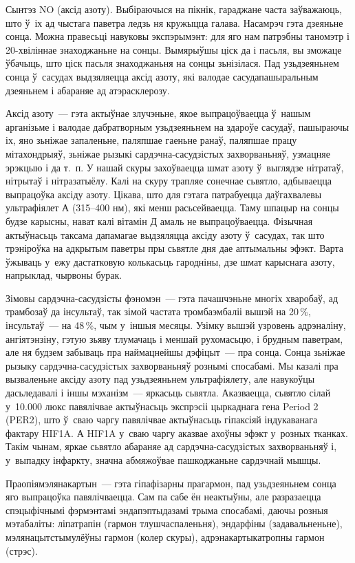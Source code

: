 Сынтэз NO (аксід азоту). Выбіраючыся на пікнік, гараджане часта заўважаюць, што ў~іх ад чыстага паветра ледзь ня кружыцца галава. Насамрэч гэта дзеяньне сонца. Можна правесьці навуковы экспэрымэнт: для яго нам патрэбны таномэтр і 20-хвіліннае знаходжаньне на сонцы. Вымярыўшы ціск да і пасьля, вы зможаце ўбачыць, што ціск пасьля знаходжаньня на сонцы зьнізілася. Пад узьдзеяньнем сонца ў~сасудах выдзяляецца аксід азоту, які валодае сасудапашыральным дзеяньнем і абараняе ад атэрасклерозу.

Аксід азоту~--- гэта актыўнае злучэньне, якое выпрацоўваецца ў~нашым арганізьме і валодае дабратворным узьдзеяньнем на здароўе сасудаў, пашыраючы іх, яно зьніжае запаленьне, паляпшае гаеньне ранаў, паляпшае працу мітахондрыяў, зьніжае рызыкі сардэчна-сасудзістых захворваньняў, узмацняе эрэкцыю і да т.~п. У нашай скуры захоўваецца шмат азоту ў~выглядзе нітратаў, нітрытаў і нітразатыёлу. Калі на скуру трапляе сонечнае сьвятло, адбываецца выпрацоўка аксіду азоту. Цікава, што для гэтага патрабуецца даўгахвалевы ультрафіялет А (315--400 нм), які менш расьсейваецца. Таму шпацыр на сонцы будзе карысны, нават калі вітамін Д амаль не выпрацоўваецца. Фізычная актыўнасьць таксама дапамагае выдзяляцца аксіду азоту ў~сасудах, так што трэніроўка на адкрытым паветры пры сьвятле дня дае аптымальны эфэкт. Варта ўжываць у~ежу дастатковую колькасьць гародніны, дзе шмат карыснага азоту, напрыклад, чырвоны бурак.

Зімовы сардэчна-сасудзісты фэномэн~--- гэта пачашчэньне многіх хваробаў, ад трамбозаў да інсультаў, так зімой частата тромбаэмбаліі вышэй на 20\,\%, інсультаў~--- на 48\,\%, чым у~іншыя месяцы. Узімку вышэй узровень адрэналіну, ангіятэнзіну, гэтую зьяву тлумачаць і меншай рухомасьцю, і брудным паветрам, але ня будзем забываць пра наймацнейшы дэфіцыт~--- пра сонца. Сонца зьніжае рызыку сардэчна-сасудзістых захворваньняў рознымі спосабамі. Мы казалі пра вызваленьне аксіду азоту пад узьдзеяньнем ультрафіялету, але навукоўцы дасьледавалі і іншы мэханізм~--- яркасьць сьвятла. Аказваецца, сьвятло сілай у~10.000 люкс павялічвае актыўнасьць экспрэсіі цыркаднага гена Period 2 (PER2), што ў~сваю чаргу павялічвае актыўнасьць гіпаксіяй індукаванага фактару HIF1A. А HIF1A у~сваю чаргу аказвае ахоўны эфэкт у~розных тканках. Такім чынам, яркае сьвятло абараняе ад сардэчна-сасудзістых захворваньняў і, у~выпадку інфаркту, значна абмяжоўвае пашкоджаньне сардэчнай мышцы.

Праопіямэлянакартын~--- гэта гіпафізарны прагармон, пад узьдзеяньнем сонца яго выпрацоўка павялічваецца. Сам па сабе ён неактыўны, але разразаецца спэцыфічнымі фэрмэнтамі эндапэптыдазамі трыма спосабамі, даючы розныя мэтабаліты: ліпатрапін (гармон тлушчаспаленьня), эндарфіны (задавальненьне), мэлянацытстымулёўны гармон (колер скуры), адрэнакартыкатропны гармон (стрэс).

